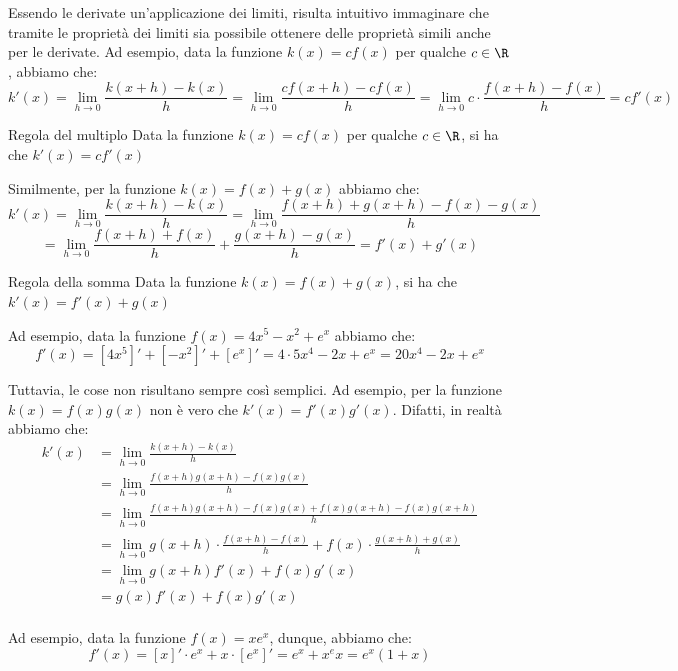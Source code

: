 \documentclass[a4paper, 12pt]{report}
\begin{document}
    Essendo le derivate un'applicazione dei limiti, risulta intuitivo immaginare che tramite le proprietà dei limiti sia possibile ottenere delle proprietà simili anche per le derivate. Ad esempio, data la funzione $k(x) = c f(x)$ per qualche $c \in \R$, abbiamo che:
    \[k'(x) = \lim_{h \to 0} \frac{k(x+h)-k(x)}{h} = \lim_{h \to 0} \frac{cf(x+h)-cf(x)}{h} = \lim_{h \to 0} c \cdot \frac{f(x+h)-f(x)}{h} = c f'(x)\]

    \begin{framedprop}{Regola del multiplo}
        Data la funzione $k(x) = cf(x)$ per qualche $c \in \R$, si ha che $k'(x) = cf'(x)$
    \end{framedprop}

    
    Similmente, per la funzione $k(x) = f(x) + g(x)$ abbiamo che:
    \[k'(x) = \lim_{h \to 0} \frac{k(x+h)-k(x)}{h} = \lim_{h \to 0} \frac{f(x+h)+g(x+h)-f(x)-g(x)}{h} \]
    \[= \lim_{h \to 0} \frac{f(x+h)+f(x)}{h} + \frac{g(x+h)-g(x)}{h} = f'(x)+g'(x)\]
    
    \begin{framedprop}{Regola della somma}
        Data la funzione $k(x) = f(x) + g(x)$, si ha che $k'(x) = f'(x)+g(x)$
    \end{framedprop}
    
    Ad esempio, data la funzione $f(x) = 4x^5 - x^2+ e^x$ abbiamo che:
    \[f'(x) = [4x^5]' + [-x^2]' + [e^x]' = 4 \cdot 5x^4 - 2x + e^x = 20x^4 - 2x + e^x\]

    Tuttavia, le cose non risultano sempre così semplici. Ad esempio, per la funzione $k(x) = f(x)g(x)$ non è vero che $k'(x) = f'(x) g'(x)$. Difatti, in realtà abbiamo che:
    \[\begin{split}
        k'(x) &= \lim_{h \to 0} \frac{k(x+h)-k(x)}{h} \\
        &= \lim_{h \to 0} \frac{f(x+h)g(x+h)-f(x)g(x)}{h} \\
        &= \lim_{h \to 0} \frac{f(x+h)g(x+h)-f(x)g(x) + f(x)g(x+h) - f(x)g(x+h)}{h} \\
        &= \lim_{h \to 0} g(x+h) \cdot \frac{f(x+h) - f(x)}{h} + f(x) \cdot \frac{g(x+h) + g(x)}{h} \\
        &= \lim_{h \to 0} g(x+h) f'(x) + f(x) g'(x) \\
        &= g(x) f'(x) + f(x) g'(x) \\
    \end{split}\]

    Ad esempio, data la funzione $f(x) = xe^x$, dunque, abbiamo che:
    \[f'(x) = [x]' \cdot e^x + x \cdot [e^x]' = e^x+x^ex = e^x(1+x)\]
\end{document}
